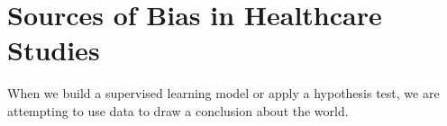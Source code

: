 \chapter{Sources of Bias in Healthcare Studies \label{chapter:biasretro}}

When we build a supervised learning model or apply a hypothesis test, we are attempting to use data to draw a conclusion about the world. 